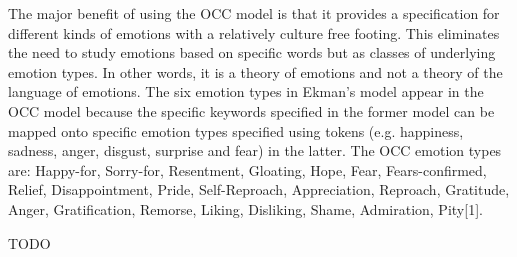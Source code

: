 The major benefit of using the OCC model is that it provides a specification for different kinds of emotions with a relatively culture free footing. This eliminates the need to study emotions based on specific words but as classes of underlying emotion types. In other words, it is a theory of emotions and not a theory of the language of emotions. The six emotion types in Ekman’s model appear in the OCC model because the specific keywords specified in the former model can be mapped onto specific emotion types specified using tokens (e.g. happiness, sadness, anger, disgust, surprise and fear) in the latter. The OCC emotion types are: Happy-for, Sorry-for, Resentment, Gloating, Hope, Fear, Fears-confirmed, Relief, Disappointment, Pride, Self-Reproach, Appreciation, Reproach, Gratitude, Anger, Gratification, Remorse, Liking, Disliking, Shame, Admiration, Pity[1].
\fi

\cite{binali2010computational}

TODO